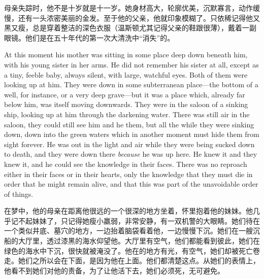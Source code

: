 \begin{paracol}{2}
\switchcolumn

母亲失踪时，他不是十岁就是十一岁。她身材高大，轮廓优美，沉默寡言，动作缓慢，还有一头浓密美丽的金发。至于他的父亲，他就印象模糊了。只依稀记得他又黑又瘦，总是穿着整洁的深色衣服（温斯顿尤其记得父亲的鞋跟很薄），戴着一副眼镜。他们是在五十年代的第一次大清洗中``消失''的。

\switchcolumn*

At this moment his mother was sitting in some place deep down beneath
him, with his young sister in her arms. He did not remember his sister
at all, except as a tiny, feeble baby, always silent, with large,
watchful eyes. Both of them were looking up at him. They were down in
some subterranean place---the bottom of a well, for instance, or a very
deep grave---but it was a place which, already far below him, was itself
moving downwards. They were in the saloon of a sinking ship, looking up
at him through the darkening water. There was still air in the saloon,
they could still see him and he them, but all the while they were
sinking down, down into the green waters which in another moment must
hide them from sight forever. He was out in the light and air while they
were being sucked down to death, and they were down there \emph{because}
he was up here. He knew it and they knew it, and he could see the
knowledge in their faces. There was no reproach either in their faces or
in their hearts, only the knowledge that they must die in order that he
might remain alive, and that this was part of the unavoidable order of
things.

\switchcolumn

在梦中，他的母亲在距离他很远的一个很深的地方坐着，怀里抱着他的妹妹。他几乎记不起妹妹了，只记得她瘦小羸弱，非常安静，有一双机警的大眼睛。她们待在一个类似井底、墓穴的地方，一边抬着脑袋看着他，一边慢慢下沉。她们在一艘沉船的大厅里，透过漆黑的海水仰望他。大厅里有空气，他们都能看到彼此，她们在绿色的海水中下沉，很快就被淹没了。他在的地方有光，有空气，她们却被死亡卷走。她们之所以会在下面，是因为他在上面。他们都清楚这点。从她们的表情上，他看不到她们对他的责备，为了让他活下去，她们必须死，无可避免。

\switchcolumn*


\end{paracol}
